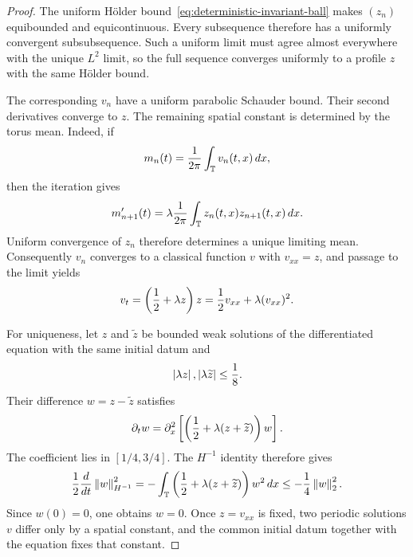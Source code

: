 \begin{proof}
The uniform H\"older bound~\eqref{eq:deterministic-invariant-ball} makes $(z_n)$ equibounded and equicontinuous. Every subsequence therefore has a uniformly convergent subsubsequence. Such a uniform limit must agree almost everywhere with the unique $L^2$ limit, so the full sequence converges uniformly to a profile $z$ with the same H\"older bound.

The corresponding $v_n$ have a uniform parabolic Schauder bound. Their second derivatives converge to $z$. The remaining spatial constant is determined by the torus mean. Indeed, if
\begin{equation*}
  m_n(t)=\frac1{2\pi}\int_\mathbb T v_n(t,x)\,dx,
\end{equation*}
then the iteration gives
\begin{equation*}
  m_{n+1}'(t)
  =
  \lambda\frac1{2\pi}
  \int_\mathbb T z_n(t,x)z_{n+1}(t,x)\,dx.
\end{equation*}
Uniform convergence of $z_n$ therefore determines a unique limiting mean. Consequently $v_n$ converges to a classical function $v$ with $v_{xx}=z$, and passage to the limit yields
\begin{equation*}
  v_t
  =
  \left(\frac12+\lambda z\right)z
  =
  \frac12v_{xx}+\lambda(v_{xx})^2.
\end{equation*}

For uniqueness, let $z$ and $\widetilde z$ be bounded weak solutions of the differentiated equation with the same initial datum and
\begin{equation*}
  \left|\lambda z\right|,\left|\lambda\widetilde z\right|\leq\frac18.
\end{equation*}
Their difference $w=z-\widetilde z$ satisfies
\begin{equation*}
  \partial_tw
  =
  \partial_x^2\left[
    \left(\frac12+\lambda(z+\widetilde z)\right)w
  \right].
\end{equation*}
The coefficient lies in $[1/4,3/4]$. The $H^{-1}$ identity therefore gives
\begin{equation*}
  \frac12\frac d{dt}\left\lVert w\right\rVert_{H^{-1}}^2
  =
  -\int_\mathbb T
  \left(\frac12+\lambda(z+\widetilde z)\right)w^2\,dx
  \leq
  -\frac14\left\lVert w\right\rVert_2^2.
\end{equation*}
Since $w(0)=0$, one obtains $w=0$. Once $z=v_{xx}$ is fixed, two periodic solutions $v$ differ only by a spatial constant, and the common initial datum together with the equation fixes that constant.


\end{proof}
